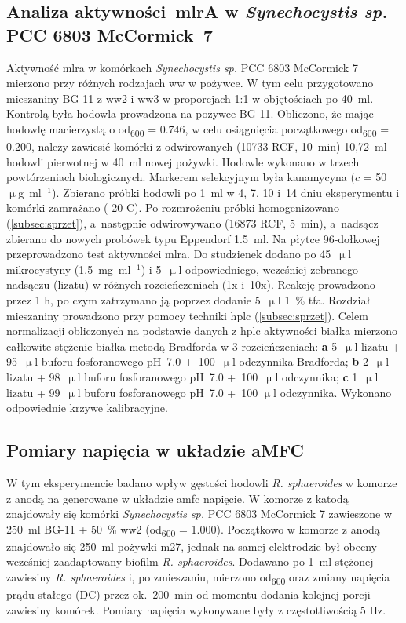 \subsection{Analiza aktywności~mlrA w \textit{Synechocystis sp.} PCC 6803 McCormick~7}\label{subsec:mlra}
Aktywność \acrshort{mlra} w komórkach
\textit{Synechocystis sp.} PCC 6803 McCormick 7 mierzono przy
różnych rodzajach \acrshort{ww} w pożywce.
W tym celu przygotowano mieszaniny BG-11 z \acrshort{ww}2 i \acrshort{ww}3
w proporcjach 1:1 w objętościach po 40~ml.
Kontrolą była hodowla prowadzona na pożywce BG-11.
Obliczono, że mając hodowlę macierzystą
o \acrshort{od}\textsubscript{600} = 0.746, w celu osiągnięcia
początkowego \acrshort{od}\textsubscript{600} = 0.200, należy zawiesić
komórki z odwirowanych (10733 RCF, 10~min) 10,72~ml hodowli
pierwotnej w 40~ml nowej pożywki.
Hodowle wykonano w trzech powtórzeniach biologicznych.
Markerem selekcyjnym była kanamycyna ($c$ = 50~$\upmu$g~ml$^{-1}$).
Zbierano próbki hodowli po 1~ml w 4, 7, 10 i~14 dniu eksperymentu
i komórki zamrażano (-20 \degree C).
Po rozmrożeniu próbki homogenizowano (\ref{subsec:sprzet}),
a~następnie odwirowywano (16873 RCF, 5~min), a~nadsącz
zbierano do nowych probówek typu Eppendorf 1.5~ml.
Na płytce 96-dołkowej przeprowadzono test aktywności \acrshort{mlra}\@.
Do studzienek dodano po 45~$\upmu$l mikrocystyny (1.5~mg~ml$^{-1}$)
i 5~$\upmu$l odpowiedniego, wcześniej zebranego nadsączu (lizatu)
w różnych rozcieńczeniach (1x i~10x).
Reakcję prowadzono przez 1 h, po czym zatrzymano ją
poprzez dodanie 5~$\upmu$l 1~\% \acrshort{tfa}\@.
Rozdział mieszaniny prowadzono przy pomocy techniki \acrshort{hplc} (\ref{subsec:sprzet}).
Celem normalizacji obliczonych na podstawie danych z \acrshort{hplc} aktywności białka
mierzono całkowite stężenie białka metodą Bradforda w 3 rozcieńczeniach:
\textbf{a} 5~$\upmu$l lizatu + 95~$\upmu$l buforu fosforanowego pH~7.0
+~100~$\upmu$l odczynnika Bradforda; \textbf{b} 2~$\upmu$l lizatu
+ 98~$\upmu$l buforu fosforanowego pH~7.0 +~100~$\upmu$l odczynnika;
\textbf{c} 1~$\upmu$l lizatu + 99~$\upmu$l buforu fosforanowego pH~7.0 +~100
$\upmu$l odczynnika.
Wykonano odpowiednie krzywe kalibracyjne.

\subsection{Pomiary napięcia w układzie aMFC}\label{subsec:volt}
W tym eksperymencie badano wpływ gęstości hodowli
\textit{R. sphaeroides} w komorze z anodą na generowane
w układzie \acrshort{amfc} napięcie.
W komorze z katodą znajdowały się komórki
\textit{Synechocystis sp.} PCC 6803 McCormick 7
zawieszone w 250~ml BG-11 + 50~\% \acrshort{ww}2
(\acrshort{od}\textsubscript{600} = 1.000).
Początkowo w komorze z anodą znajdowało się 250~ml
pożywki \acrshort{m27}, jednak na samej elektrodzie był
obecny wcześniej zaadaptowany biofilm \textit{R. sphaeroides}.
Dodawano po 1~ml stężonej zawiesiny \textit{R. sphaeroides}
i, po zmieszaniu, mierzono \acrshort{od}\textsubscript{600} oraz
zmiany napięcia prądu stałego (DC) przez ok.\ 200~min od
momentu dodania kolejnej porcji zawiesiny komórek.
Pomiary napięcia wykonywane były z częstotliwością 5 Hz.